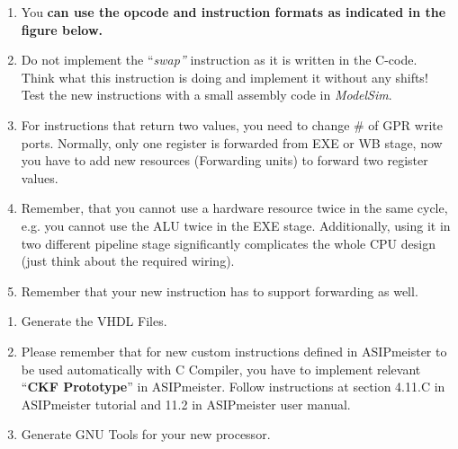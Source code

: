 \documentclass[
]{article}
\begin{document}
\begin{enumerate}
\def\labelenumi{\arabic{enumi}.}
\item
  You \textbf{can use the opcode and instruction formats as indicated in
  the figure below.}
\item
  Do not implement the ``\emph{swap''} instruction as it is written in
  the C-code. Think what this instruction is doing and implement it
  without any shifts! Test the new instructions with a small assembly
  code in \emph{ModelSim}.
\item
  For instructions that return two values, you need to change \# of GPR
  write ports. Normally, only one register is forwarded from EXE or WB
  stage, now you have to add new resources (Forwarding units) to forward
  two register values.
\item
  Remember, that you cannot use a hardware resource twice in the same
  cycle, e.g. you cannot use the ALU twice in the EXE stage.
  Additionally, using it in two different pipeline stage significantly
  complicates the whole CPU design (just think about the required
  wiring).
\item
  Remember that your new instruction has to support forwarding as well.
\end{enumerate}

\begin{enumerate}
\def\labelenumi{\arabic{enumi}.}
\setcounter{enumi}{1}
\item
  Generate the VHDL Files.
\item
  Please remember that for new custom instructions defined in
  ASIPmeister to be used automatically with C Compiler, you have to
  implement relevant ``\textbf{CKF Prototype}'' in ASIPmeister. Follow
  instructions at section 4.11.C in ASIPmeister tutorial and 11.2 in
  ASIPmeister user manual.
\item
  Generate GNU Tools for your new processor.
\end{enumerate}
\end{document}
